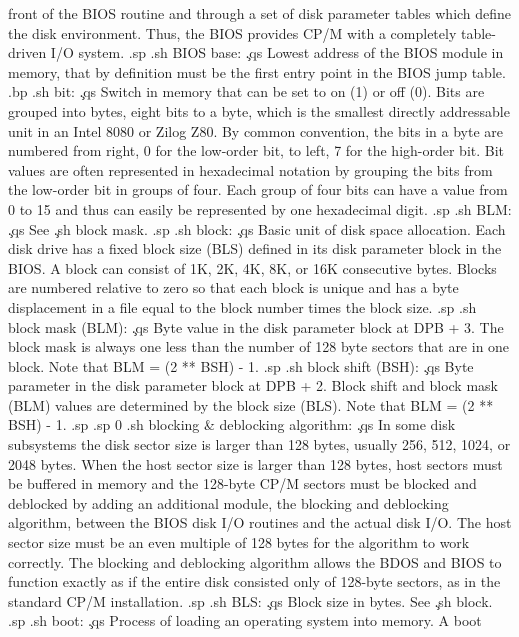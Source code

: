 front of the BIOS routine and through a set of disk parameter 
tables which define the disk environment.  Thus, the BIOS 
provides CP/M with a completely table-driven I/O system.
.sp
.sh
BIOS base:  \c
.qs
Lowest address of the BIOS module in memory, that by definition  
must be the first entry point in the BIOS jump table.
.bp
.sh
bit:  \c
.qs
Switch in memory that can be set to on (1) or off (0).  Bits are 
grouped into bytes, eight bits to a byte, which is the smallest 
directly addressable unit in an Intel 8080 or Zilog Z80.  By 
common convention, the bits in a byte are numbered from right, 0 
for the low-order bit, to left, 7 for the high-order bit.  Bit 
values are often represented in hexadecimal notation by grouping 
the bits from the low-order bit in groups of four.  Each group of 
four bits can have a value from 0 to 15 and thus can easily be 
represented by one hexadecimal digit.
.sp
.sh
BLM:  \c
.qs
See \c
.sh
block mask.
.sp
.sh
block:  \c
.qs
Basic unit of disk space allocation.  Each disk drive has a fixed 
block size (BLS) defined in its disk parameter block in the BIOS.  
A block can consist of 1K, 2K, 4K, 8K, or 16K consecutive bytes.  
Blocks are numbered relative to zero so that each block is unique 
and has a byte displacement in a file equal to the block number 
times the block size.
.sp
.sh
block mask (BLM):  \c
.qs
Byte value in the disk parameter block at DPB + 3.  The block 
mask is always one less than the number of 128 byte sectors that 
are in one block.  Note that BLM = (2 ** BSH) - 1.
.sp
.sh
block shift (BSH):  \c
.qs
Byte parameter in the disk parameter block at DPB + 2.  
Block shift and block mask (BLM) values are determined by the 
block size (BLS).  Note that BLM = (2 ** BSH) - 1.
.sp
.sp 0
.sh
blocking & deblocking algorithm:  \c
.qs
In some disk subsystems the disk sector size is larger than 128 
bytes, usually 256, 512, 1024, or 2048 bytes.  When the host 
sector size is larger than 128 bytes, host sectors must be 
buffered in memory and the 128-byte CP/M sectors must be blocked 
and deblocked by adding an additional module, the blocking and 
deblocking algorithm, between the BIOS disk I/O routines and the 
actual disk I/O.  The host sector size must be an even multiple 
of 128 bytes for the algorithm to work correctly.  The blocking 
and deblocking algorithm allows the BDOS and BIOS to function 
exactly as if the entire disk consisted only of 128-byte sectors, 
as in the standard CP/M installation.
.sp
.sh
BLS:  \c
.qs
Block size in bytes.  See \c
.sh
block.
.sp
.sh
boot:  \c
.qs
Process of loading an operating system into memory.  A boot 
